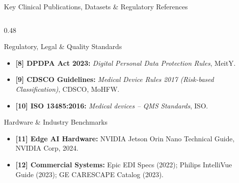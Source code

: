 \documentclass[aspectratio=169, 11pt]{beamer}
\begin{document}
\begin{frame}{Key Clinical Publications, Datasets \& Regulatory References}
\begin{columns}[t]
        \begin{column}{0.48\textwidth}
            \begin{block}{\textcolor{neonAmber}{Regulatory, Legal \& Quality Standards}}
                \tiny
                \begin{itemize}
                    \item \textbf{[8] DPDPA Act 2023:} \textit{Digital Personal Data Protection Rules}, MeitY.
                    \item \textbf{[9] CDSCO Guidelines:} \textit{Medical Device Rules 2017 (Risk-based Classification)}, CDSCO, MoHFW.
                    \item \textbf{[10] ISO 13485:2016:} \textit{Medical devices -- QMS Standards}, ISO.
                \end{itemize}
            \end{block}

            \begin{block}{\textcolor{neonRose}{Hardware \& Industry Benchmarks}}
                \tiny
                \begin{itemize}
                    \item \textbf{[11] Edge AI Hardware:} NVIDIA Jetson Orin Nano Technical Guide, NVIDIA Corp, 2024.
                    \item \textbf{[12] Commercial Systems:} Epic EDI Specs (2022); Philips IntelliVue Guide (2023); GE CARESCAPE Catalog (2023).
                \end{itemize}
            \end{block}
        \end{column}
    \end{columns}
\end{frame}
\end{document}
